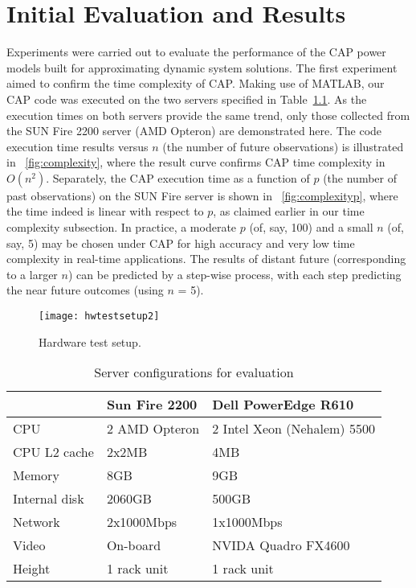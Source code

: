 % 
%
\chapter{Initial Evaluation and Results}
\label{chp:evaluation}
Experiments were carried out to evaluate the performance of the CAP
power models built for approximating dynamic system solutions.  The
first experiment aimed to confirm the time complexity of CAP.  Making
use of MATLAB, our CAP code was executed on the two servers specified in
Table~\ref{tab:hardware}.  As the execution times on both servers
provide the same trend, only those collected from the SUN Fire 2200
server (AMD Opteron) are demonstrated here.  The code execution time
results versus $n$ (the number of future observations) is illustrated in
\figurename~\ref{fig:complexity}, where the result curve confirms CAP
time complexity in $O(n^{2})$.  Separately, the CAP execution time as a
function of $p$ (the number of past observations) on the SUN Fire server
is shown in \figurename~\ref{fig:complexityp}, where the time indeed is
linear with respect to $p$, as claimed earlier in our time complexity
subsection.  In practice, a moderate $p$ (of, say, 100) and a small $n$
(of, say, 5) may be chosen under CAP for high accuracy and very low time
complexity in real-time applications.  The results of distant future
(corresponding to a larger $n$) can be predicted by a step-wise process,
with each step predicting the near future outcomes (using $n$ = 5).
\begin{figure*}[tp]
  \centering
  \texttt{[image: hwtestsetup2]}
  \caption{Hardware test setup.}
  \label{fig:hardware}
\end{figure*}
\begin{table}[tbhp]
  \centering
  \caption{Server configurations for evaluation}
  \label{tab:hardware}
  \begin{tabular}{l l l}
   \hline
    &\textbf{Sun Fire 2200}&\textbf{Dell PowerEdge R610}\\  
    \hline
    CPU&2 AMD Opteron&2 Intel Xeon (Nehalem) 5500\\
    CPU L2 cache&2x2MB&4MB\\
    Memory&8GB&9GB\\
    Internal disk&2060GB&500GB\\
    Network&2x1000Mbps&1x1000Mbps\\
    Video&On-board&NVIDA Quadro FX4600\\
    Height&1 rack unit&1 rack unit\\
    \hline
  \end{tabular}
\end{table}
